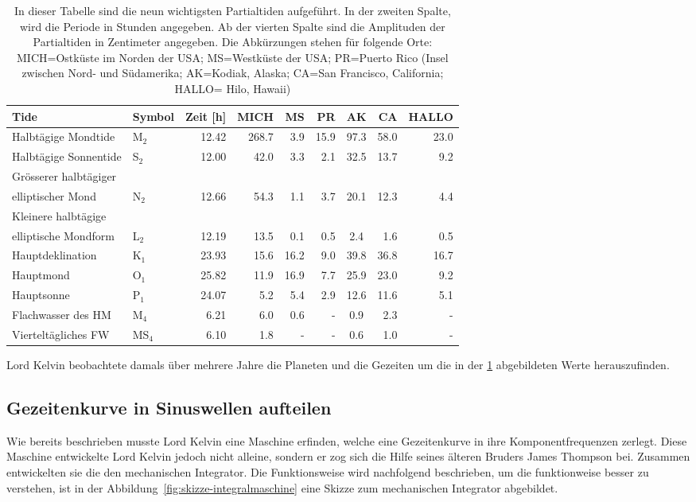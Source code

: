 \begin{table}
	\centering
	
\begin{tabular}{|l|l|r|r|r|r|c|r|r|}
	\hline
	Tide&Symbol&Zeit [h]&MICH&MS&PR&AK&CA&HALLO\\
	\hline \hline
	Halbtägige Mondtide&M$_{2}$&12.42&268.7&3.9&15.9&97.3&58.0&23.0\\
	\hline
	Halbtägige Sonnentide&S$_{2}$&12.00&42.0&3.3&2.1&32.5&13.7&9.2\\
	\hline
	Grösserer halbtägiger&&&&&&&&\\
	elliptischer Mond&N$_{2}$&12.66&54.3&1.1&3.7&20.1&12.3&4.4\\
	\hline
	Kleinere halbtägige&&&&&&&&\\
	elliptische Mondform&L$_{2}$&12.19&13.5&0.1&0.5&2.4&1.6&0.5\\
	\hline\hline 
	Hauptdeklination&K$_{1}$&23.93&15.6&16.2&9.0&39.8&36.8&16.7\\
	\hline
	Hauptmond&O$_{1}$&25.82&11.9&16.9&7.7&25.9&23.0&9.2\\
	\hline
	Hauptsonne&P$_{1}$&24.07&5.2&5.4&2.9&12.6&11.6&5.1\\
	\hline\hline
	Flachwasser des HM&M$_{4}$&6.21&6.0&0.6&-&0.9&2.3&-\\
	\hline
	Vierteltägliches FW&MS$_{4}$&6.10&1.8&-&-&0.6&1.0&-\\
	\hline	
\end{tabular}
	
\caption{In dieser Tabelle sind die neun wichtigsten Partialtiden aufgeführt. In der zweiten Spalte, wird die Periode in Stunden angegeben. Ab der vierten Spalte sind die Amplituden der Partialtiden in Zentimeter angegeben. Die Abkürzungen stehen für folgende Orte: MICH=Ostküste im Norden der USA; MS=Westküste der USA; PR=Puerto Rico (Insel zwischen Nord- und Südamerika; AK=Kodiak, Alaska; CA=San Francisco, California; HALLO= Hilo, Hawaii)}
\label{gezeiten:tabelle:partialtiden}
\end{table}

Lord Kelvin beobachtete damals über mehrere Jahre die Planeten und die Gezeiten um die in der \ref{gezeiten:tabelle:partialtiden} abgebildeten Werte herauszufinden. 

\subsection{Gezeitenkurve in Sinuswellen aufteilen
	\label{gezeiten:subsection:malorum}}
Wie bereits beschrieben musste Lord Kelvin eine Maschine erfinden, welche eine Gezeitenkurve in ihre Komponentfrequenzen zerlegt.
Diese Maschine entwickelte Lord Kelvin jedoch nicht alleine, sondern er zog sich die Hilfe seines älteren Bruders James Thompson bei.
Zusammen entwickelten sie die den mechanischen Integrator.
Die Funktionsweise wird nachfolgend beschrieben, um die funktionweise
besser zu verstehen, ist in der Abbildung~\ref{fig:skizze-integralmaschine}
eine Skizze zum mechanischen Integrator
abgebildet.

